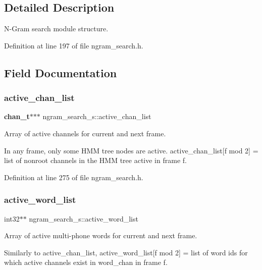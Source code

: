 \subsection{Detailed Description}
N-\/\+Gram search module structure. 

Definition at line 197 of file ngram\+\_\+search.\+h.



\subsection{Field Documentation}
\mbox{\label{structngram__search__s_a83731bf0e2234e632c5e78f2321f5b2d}} 
\subsubsection{active\+\_\+chan\+\_\+list}
{\footnotesize\ttfamily \textbf{ chan\+\_\+t}$\ast$$\ast$$\ast$ ngram\+\_\+search\+\_\+s\+::active\+\_\+chan\+\_\+list}



Array of active channels for current and next frame. 

In any frame, only some H\+MM tree nodes are active. active\+\_\+chan\+\_\+list[f mod 2] = list of nonroot channels in the H\+MM tree active in frame f. 

Definition at line 275 of file ngram\+\_\+search.\+h.

\mbox{\label{structngram__search__s_a5056573bf95990cc28c97a56cd76ce9a}} 
\subsubsection{active\+\_\+word\+\_\+list}
{\footnotesize\ttfamily int32$\ast$$\ast$ ngram\+\_\+search\+\_\+s\+::active\+\_\+word\+\_\+list}



Array of active multi-\/phone words for current and next frame. 

Similarly to active\+\_\+chan\+\_\+list, active\+\_\+word\+\_\+list[f mod 2] = list of word ids for which active channels exist in word\+\_\+chan in frame f.

